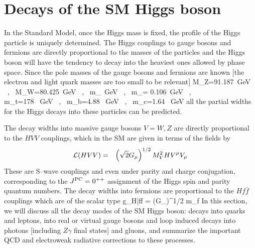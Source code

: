 \section{Decays of the SM Higgs boson}
\setcounter{equation}{0}
\renewcommand{\theequation}{2.\arabic{equation}}


In the Standard Model, once the Higgs mass is fixed, the profile of the
Higgs particle is uniquely determined. The Higgs couplings to gauge bosons 
and fermions are directly proportional to the masses of the particles and
the Higgs boson will have the tendency to decay into the heaviest ones 
allowed by phase space. Since the pole masses of the gauge bosons and 
fermions are known [the electron and light quark masses are too small to be
relevant]
\beq 
M_Z=91.187~{\rm GeV} \ , \ M_W=80.425~{\rm GeV} \ , \ m_~{\rm GeV} 
\ , \  m_\mu= 0.106~{\rm GeV} \, , \non \\ 
m_t=178 ~{\rm GeV} \ , \
m_b=4.88 ~{\rm GeV} \ , \
m_c=1.64 ~{\rm GeV} \hspace*{1cm}
\label{allmasses}
\eeq
all the partial widths for the Higgs decays into these particles can be 
predicted.\s 

The decay widths into massive gauge bosons $V=W,Z$ are directly proportional 
to the $HVV$ couplings, which in the SM are given in terms of the fields by 
\begin{eqnarray}
{\cal L}(HVV)&=&\left(\sqrt2G_\mu\right)^{1/2}M_V^2HV^\mu V_\mu 
\label{HVVcp}
\end{eqnarray}
These are S--wave couplings and even under parity and charge conjugation,
corresponding to the $J^{\rm PC}=0^{++}$ assignment of the Higgs  spin and
parity quantum numbers. The decay widths into fermions are proportional to
the $H f\bar{f}$ couplings which are of the scalar type
\beq
g_{H\bar{f}f} \propto {} =  (G_\mu)^{1/2} m_f 
\label{Hffcp}
\eeq
In this section, we will discuss all the decay modes of the SM Higgs boson: 
decays into quarks and leptons, into real or virtual gauge bosons and loop 
induced decays into photons [including $Z\gamma$ final states] and gluons, and
summarize the important QCD and electroweak radiative corrections to 
these processes. \s 

